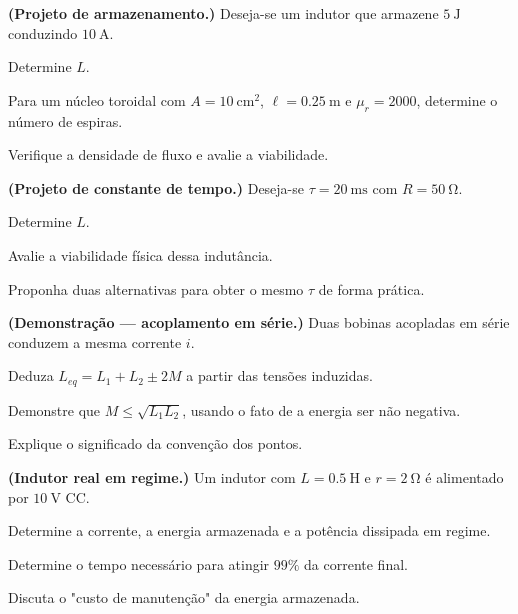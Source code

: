 \begin{questao}[4]{}

\textbf{(Projeto de armazenamento.)} Deseja-se um indutor que armazene
$\SI{5}{\joule}$ conduzindo $\SI{10}{\ampere}$.
\begin{itensq}
\item Determine $L$.
\item Para um núcleo toroidal com $A=\SI{10}{\centi\meter\squared}$,
      $\ell=\SI{0.25}{\meter}$ e $\mu_r=2000$, determine o número de espiras.
\item Verifique a densidade de fluxo e avalie a viabilidade.
\end{itensq}


\end{questao}
\begin{questao}[4]{}

\textbf{(Projeto de constante de tempo.)} Deseja-se $\tau=\SI{20}{\milli\second}$
com $R=\SI{50}{\ohm}$.
\begin{itensq}
\item Determine $L$.
\item Avalie a viabilidade física dessa indutância.
\item Proponha duas alternativas para obter o mesmo $\tau$ de forma prática.
\end{itensq}


\end{questao}
\begin{questao}[4]{}

\textbf{(Demonstração --- acoplamento em série.)} Duas bobinas acopladas em
série conduzem a mesma corrente $i$.
\begin{itensq}
\item Deduza $L_{eq}=L_1+L_2\pm2M$ a partir das tensões induzidas.
\item Demonstre que $M\le\sqrt{L_1L_2}$, usando o fato de a energia ser não
      negativa.
\item Explique o significado da convenção dos pontos.
\end{itensq}


\end{questao}
\begin{questao}[4]{}

\textbf{(Indutor real em regime.)} Um indutor com $L=\SI{0.5}{\henry}$ e
$r=\SI{2}{\ohm}$ é alimentado por $\SI{10}{\volt}$ CC.
\begin{itensq}
\item Determine a corrente, a energia armazenada e a potência dissipada em
      regime.
\item Determine o tempo necessário para atingir $99\%$ da corrente final.
\item Discuta o "custo de manutenção" da energia armazenada.
\end{itensq}


\end{questao}
